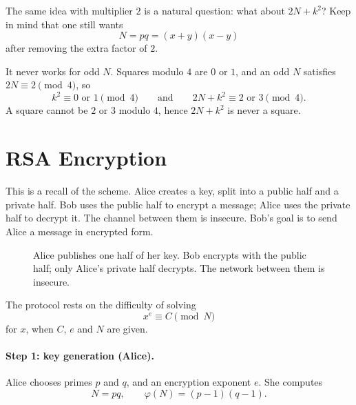 The same idea with multiplier $2$ is a natural question: what about $2N+k^2$? Keep in mind that one still wants
\[
    N=pq=(x+y)(x-y)
\]
after removing the extra factor of $2$.


It never works for odd $N$. Squares modulo $4$ are $0$ or $1$, and an odd $N$ satisfies $2N\equiv 2\pmod{4}$, so
\[
    k^2\equiv 0\text{ or }1\pmod{4}
    \qquad\text{and}\qquad
    2N+k^2\equiv 2\text{ or }3\pmod{4}.
\]
A square cannot be $2$ or $3$ modulo $4$, hence $2N+k^2$ is never a square.


\section{RSA Encryption}

This is a recall of the scheme. Alice creates a key, split into a public half and a private half. Bob uses the public half to encrypt a message; Alice uses the private half to decrypt it. The channel between them is insecure. Bob's goal is to send Alice a message in encrypted form.

\begin{figure}[H]
\centering
{}
\caption{Alice publishes one half of her key. Bob encrypts with the public half; only Alice's private half decrypts. The network between them is insecure.}
\end{figure}

The protocol rests on the difficulty of solving
\[
    x^{e}\equiv C\pmod{N}
\]
for $x$, when $C$, $e$ and $N$ are given.

\paragraph{Step 1: key generation (Alice).}
Alice chooses primes $p$ and $q$, and an encryption exponent $e$. She computes
\[
    N=pq, \qquad \varphi(N)=(p-1)(q-1).
\]

